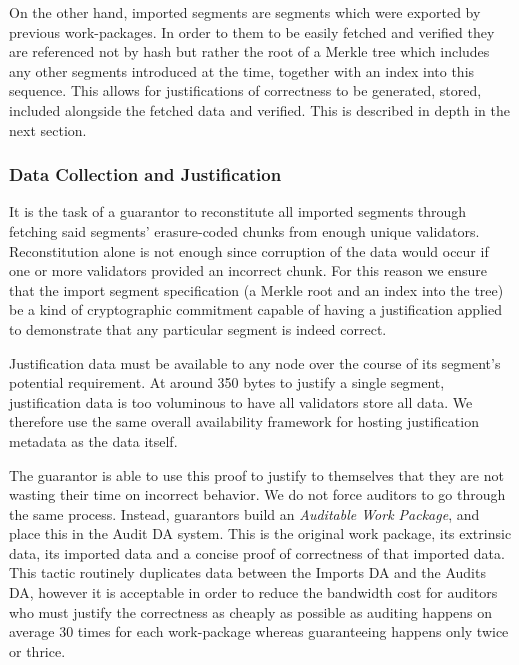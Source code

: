 On the other hand, imported segments are segments which were exported by previous work-packages. In order to them to be easily fetched and verified they are referenced not by hash but rather the root of a Merkle tree which includes any other segments introduced at the time, together with an index into this sequence. This allows for justifications of correctness to be generated, stored, included alongside the fetched data and verified. This is described in depth in the next section.

\subsubsection{Data Collection and Justification}


It is the task of a guarantor to reconstitute all imported segments through fetching said segments' erasure-coded chunks from enough unique validators. Reconstitution alone is not enough since corruption of the data would occur if one or more validators provided an incorrect chunk. For this reason we ensure that the import segment specification (a Merkle root and an index into the tree) be a kind of cryptographic commitment capable of having a justification applied to demonstrate that any particular segment is indeed correct.

Justification data must be available to any node over the course of its segment's potential requirement. At around 350 bytes to justify a single segment, justification data is too voluminous to have all validators store all data. We therefore use the same overall availability framework for hosting justification metadata as the data itself.

The guarantor is able to use this proof to justify to themselves that they are not wasting their time on incorrect behavior. We do not force auditors to go through the same process. Instead, guarantors build an \emph{Auditable Work Package}, and place this in the Audit DA system. This is the original work package, its extrinsic data, its imported data and a concise proof of correctness of that imported data. This tactic routinely duplicates data between the Imports DA and the Audits DA, however it is acceptable in order to reduce the bandwidth cost for auditors who must justify the correctness as cheaply as possible as auditing happens on average 30 times for each work-package whereas guaranteeing happens only twice or thrice.

